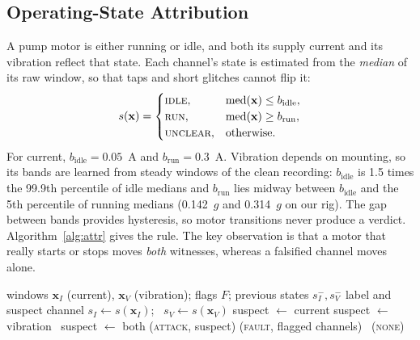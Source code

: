 \documentclass[conference]{IEEEtran}
\begin{document}
\subsection{Operating-State Attribution}

A pump motor is either running or idle, and both its supply current and its vibration reflect that state. Each channel's state is estimated from the \emph{median} of its raw window, so that taps and short glitches cannot flip it:
\begin{equation}
s(\mathbf{x}) = \begin{cases}
\textsc{idle}, & \operatorname{med}(\mathbf{x}) \leq b_{\mathrm{idle}},\\
\textsc{run}, & \operatorname{med}(\mathbf{x}) \geq b_{\mathrm{run}},\\
\textsc{unclear}, & \text{otherwise}.
\end{cases}
\end{equation}
For current, $b_{\mathrm{idle}} = 0.05$~A and $b_{\mathrm{run}} = 0.3$~A. Vibration depends on mounting, so its bands are learned from steady windows of the clean recording: $b_{\mathrm{idle}}$ is 1.5 times the 99.9th percentile of idle medians and $b_{\mathrm{run}}$ lies midway between $b_{\mathrm{idle}}$ and the 5th percentile of running medians (0.142~$g$ and 0.314~$g$ on our rig). The gap between bands provides hysteresis, so motor transitions never produce a verdict. Algorithm~\ref{alg:attr} gives the rule. The key observation is that a motor that really starts or stops moves \emph{both} witnesses, whereas a falsified channel moves alone.

\begin{algorithm}[t]
\caption{Operating-state attribution for one window}
\label{alg:attr}
\small
\begin{algorithmic}[1]
\Require windows $\mathbf{x}_I$ (current), $\mathbf{x}_V$ (vibration); flags $F$; previous states $s_I^-, s_V^-$
\Ensure label and suspect channel
\State $s_I \gets s(\mathbf{x}_I)$; \ $s_V \gets s(\mathbf{x}_V)$
   \State suspect $\gets$ current
   \State suspect $\gets$ vibration
  \Else \ suspect $\gets$ both
  \EndIf
  \State \Return (\textsc{attack}, suspect)
  \State \Return (\textsc{fault}, flagged channels)
\Else \ \Return (\textsc{none})
\EndIf
\end{algorithmic}
\end{algorithm}
\end{document}
